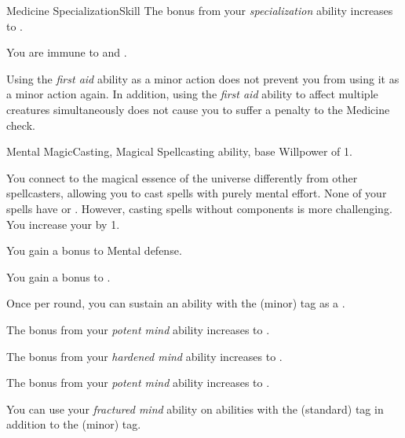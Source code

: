 \begin{feat}{Medicine Specialization}{Skill}
         The bonus from your \textit{specialization} ability increases to .

         You are immune to  and .

         Using the \textit{first aid} ability as a minor action does not prevent you from using it as a minor action again.
        In addition, using the \textit{first aid} ability to affect multiple creatures simultaneously does not cause you to suffer a penalty to the Medicine check.
    \end{feat}

    \begin{feat}{Mental Magic}{Casting, Magical}
        \featpre Spellcasting ability, base Willpower of 1.

         You connect to the magical essence of the universe differently from other spellcasters, allowing you to cast spells with purely mental effort.
        None of your spells have  or .
        However, casting spells without components is more challenging.
        You increase your  by 1.

         You gain a  bonus to Mental defense.

         You gain a  bonus to  .

         Once per round, you can sustain an ability with the  (minor) tag as a .

         The bonus from your \textit{potent mind} ability increases to .

         The bonus from your \textit{hardened mind} ability increases to .

         The bonus from your \textit{potent mind} ability increases to .

         You can use your \textit{fractured mind} ability on abilities with the  (standard) tag in addition to the  (minor) tag.
    \end{feat}

